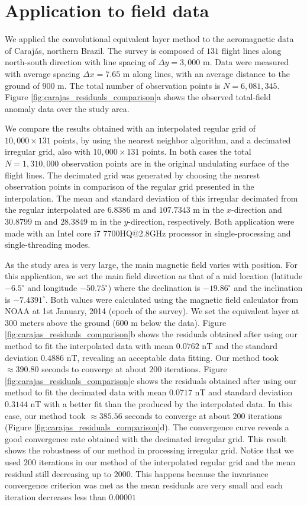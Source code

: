 \documentclass[manuscript]{geophysics}
\begin{document}
\section{Application to field data}

We applied the convolutional equivalent layer method to the aeromagnetic data of Carajás, 
northern Brazil.
The survey is composed of $131$ flight lines along north-south direction with line spacing of 
$\Delta y = 3,000$ m. 
Data were measured with average spacing $\Delta x = 7.65$ m along lines,
with an average distance to the ground of $900$ m. 
The total number of observation points is $N = 6,081,345$. Figure \ref{fig:carajas_residuals_comparison}a
shows the observed total-field anomaly data over the study area.

We compare the results obtained with an interpolated regular grid of $10,000 \times 131$ points, 
by using the nearest neighbor algorithm, and a decimated irregular grid, also with $10,000 \times 131$
points. In both cases the total $N = 1,310,000$ observation points are in the original undulating surface of the flight lines. 
The decimated grid was generated by 
choosing the nearest observation points in comparison of the regular grid presented in the interpolation.
The mean and standard deviation of this irregular decimated from the regular interpolated are $6.8386$ m and $107.7343$ m in the $x$-direction and $30.8799$ m and $28.3849$ m in the $y$-direction, respectively.
Both application were made with an Intel core i7 7700HQ@2.8GHz processor in single-processing and 
single-threading modes. 

As the study area is very large, the main magnetic field varies with position.
For this application, we set the main field direction as that of a mid location 
(latitude $-6.5^{\circ}$ and longitude $-50.75^{\circ}$) where the declination is $-19.86^{\circ}$ and
the inclination is $-7.4391^{\circ}$. Both values were calculated using the magnetic field calculator from NOAA
at 1st January, 2014 (epoch of the survey). We set the equivalent layer at $300$ meters above the ground ($600$ m below the data).
Figure \ref{fig:carajas_residuals_comparison}b shows the residuals obtained after using our method to fit
the interpolated data with mean $0.0762$ nT and the standard deviation  $0.4886$ nT, revealing an acceptable data fitting. Our method took $\approx 390.80$ seconds to converge at about $200$ iterations.
Figure \ref{fig:carajas_residuals_comparison}c shows the residuals obtained after using our method to fit
the decimated data with mean $0.0717$ nT and standard deviation 
$0.3144$ nT with a better fit than the produced by the interpolated data. In this case, our method took $\approx 385.56$ seconds to converge at about $200$ iterations (Figure \ref{fig:carajas_residuals_comparison}d). 
The convergence curve reveals a good convergence rate obtained with the decimated 
irregular grid. This result shows the robustness of our method in processing irregular grid. Notice that we used $200$ iterations in our method of the interpolated regular grid and the mean residual still decreasing up to $2000$. This happens because the invariance convergence criterion was met as the mean residuals are very small and each iteration decreases less than $0.00001$
\end{document}
